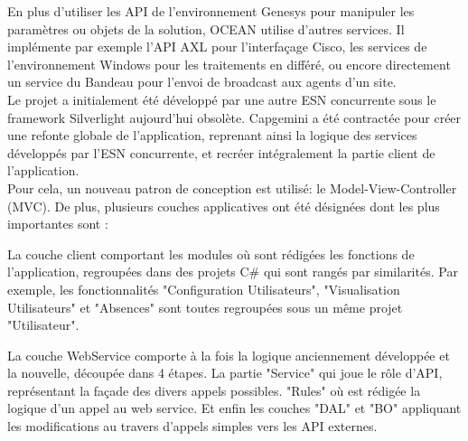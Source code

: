 \documentclass{rapport}
\begin{document}
En plus d'utiliser les API de l'environnement Genesys pour manipuler les paramètres ou objets de la solution, OCEAN utilise d'autres services. Il implémente par exemple l'API AXL pour l'interfaçage Cisco, les services de l'environnement Windows pour les traitements en différé, ou encore directement un service du Bandeau pour l'envoi de broadcast aux agents d'un site.\\

Le projet a initialement été développé par une autre ESN concurrente sous le framework Silverlight aujourd'hui obsolète. Capgemini a été contractée pour créer une refonte globale de l'application, reprenant ainsi la logique des services développés par l'ESN concurrente, et recréer intégralement la partie client de l'application.\\
Pour cela, un nouveau patron de conception est utilisé: le Model-View-Controller (MVC). De plus, plusieurs couches applicatives ont été désignées dont les plus importantes sont :\\

\begin{minipage}{0.35\textwidth}
\end{minipage}
\begin{minipage}{0.55\textwidth}
La couche client comportant les modules où sont rédigées les fonctions de l'application, regroupées dans des projets C\# qui sont rangés par similarités. Par exemple, les fonctionnalités "Configuration Utilisateurs", "Visualisation Utilisateurs" et "Absences" sont toutes regroupées sous un même projet "Utilisateur".
\end{minipage}
\vspace{5mm} %

\begin{minipage}{0.35\textwidth}
\end{minipage}
\begin{minipage}{0.55\textwidth}
La couche WebService comporte à la fois la logique anciennement développée et la nouvelle, découpée dans 4 étapes. La partie "Service" qui joue le rôle d'API, représentant la façade des divers appels possibles. "Rules" où est rédigée la logique d'un appel au web service. Et enfin les couches "DAL" et "BO" appliquant les modifications au travers d'appels simples vers les API externes.
\end{minipage}
\vspace{5mm} %
\\
\end{document}
